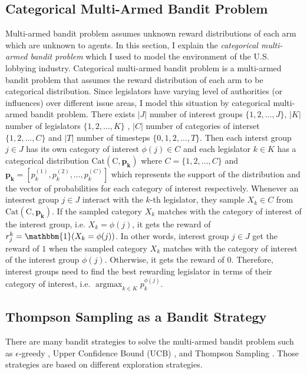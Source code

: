 \documentclass{article}
\begin{document}
\subsection{\large{ 
Categorical Multi-Armed Bandit Problem}} \label{vanilla}

Multi-armed bandit problem 
assumes unknown reward distributions 
of each arm
which are unknown to agents.
In this section, I explain 
the \textit{categorical multi-armed bandit problem}
which I used to model the 
environment of the U.S. lobbying industry.
Categorical multi-armed bandit problem
is a multi-armed bandit problem
that assumes the reward distribution of each arm to be categorical distribution.
Since legislators have varying level of authorities (or influences) 
over different issue areas,
I model this situation by categorical multi-armed bandit problem. There exists $|J|$ number of interest groups 
$\{1, 2, \hdots, J\}$, $|K|$ number of legislators $\{1, 2, \hdots, K\}$ 
, $|C|$ number of categories of interset $\{1,2, \hdots, C\}$ and
$|T|$ number of timesteps $\{0, 1, 2, \hdots, T\}$.  
Then each interst group $j \in J$ has its 
own category of interest $\phi(j) \in C$ and
each legislator $k \in K$ has a categorical distribution 
$\operatorname{Cat(C, \mathbf{p_k})}$ where
$C=\{1,2,\hdots, C\}$ and $\mathbf{p_k} = [p_k^{(1)}, p_k^{(2)}, \hdots, p_k^{(C)}]$
which represents the support of the distribution
and the vector of probabilities for each category of interest respectively.
Whenever an intesrest group $j \in J$ interact with the $k$-th legislator, they
sample $X_k \in C$ from $\operatorname{Cat(C, \mathbf{p_k})}$.
If the sampled category $X_k$ matches with the category of interest of the interest group, i.e. 
$X_k = \phi(j)$,
it gets the reward of $r_j^k = \mathbbm{1}(X_{k} = \phi(j))$. 
In other words, 
interest group $j \in J$
get the reward of $1$
when the sampled category $X_k$ matches with the category of interest of the interest group $\phi(j)$.
Otherwise, it gets the reward of $0$.
Therefore, interest groups 
need to find the best rewarding 
legislator in terms of their category of interest, i.e. 
$\operatorname{argmax}_{k \in K} p_k^{\phi(j)}$.


\subsection{\large{Thompson Sampling as a Bandit Strategy}}
There are many bandit strategies to solve the multi-armed bandit problem
such as $\epsilon$-greedy \citep{egrdy}, Upper Confidence Bound (UCB) \citep{ucb}, and Thompson Sampling \citep{tom}.
Those strategies are based on different exploration strategies.
\end{document}
